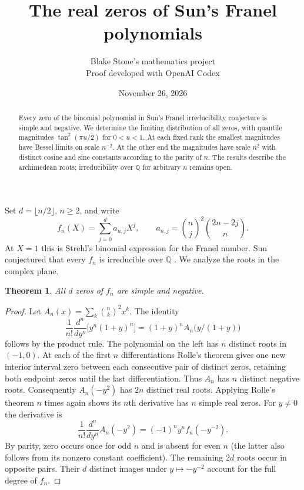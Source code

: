 \documentclass[11pt]{article}
\title{The real zeros of Sun's Franel polynomials}
\author{Blake Stone's mathematics project\\\small Proof developed with OpenAI Codex}
\date{November 26, 2026}
\newtheorem{theorem}{Theorem}
\begin{document}
\maketitle
\begin{abstract}
Every zero of the binomial polynomial in Sun's Franel irreducibility conjecture is simple and negative. We determine the limiting distribution of all zeros, with quantile magnitudes $\tan^2(\pi u/2)$ for $0<u<1$. At each fixed rank the smallest magnitudes have Bessel limits on scale $n^{-2}$. At the other end the magnitudes have scale $n^2$ with distinct cosine and sine constants according to the parity of $n$. The results describe the archimedean roots; irreducibility over $\mathbb Q$ for arbitrary $n$ remains open.
\end{abstract}

Set $d=\lfloor n/2\rfloor$, $n\ge2$, and write
\[
 f_n(X)=\sum_{j=0}^d a_{n,j}X^j,\qquad a_{n,j}=\binom nj^2\binom{2n-2j}n.
\]
At $X=1$ this is Strehl's binomial expression for the Franel number. Sun conjectured that every $f_n$ is irreducible over $\mathbb Q$ \cite{source,strehl}. We analyze the roots in the complex plane.

\begin{theorem}\label{simple}
All $d$ zeros of $f_n$ are simple and negative.
\end{theorem}
\begin{proof}
Let $A_n(x)=\sum_k\binom nk^2 x^k$. The identity
\[
 \frac1{n!}\frac{d^n}{dy^n}\big[y^n(1+y)^n\big]=(1+y)^n A_n\big(y/(1+y)\big)
\]
follows by the product rule. The polynomial on the left has $n$ distinct roots in $(-1,0)$. At each of the first $n$ differentiations Rolle's theorem gives one new interior interval zero between each consecutive pair of distinct zeros, retaining both endpoint zeros until the last differentiation. Thus $A_n$ has $n$ distinct negative roots. Consequently $A_n(-y^2)$ has $2n$ distinct real roots. Applying Rolle's theorem $n$ times again shows its $n$th derivative has $n$ simple real zeros. For $y\ne0$ the derivative is
\[
 \frac1{n!}\frac{d^n}{dy^n} A_n(-y^2)=(-1)^n y^n f_n(-y^{-2}).
\]
By parity, zero occurs once for odd $n$ and is absent for even $n$ (the latter also follows from its nonzero constant coefficient). The remaining $2d$ roots occur in opposite pairs. Their $d$ distinct images under $y\mapsto-y^{-2}$ account for the full degree of $f_n$.
\end{proof}
\end{document}
